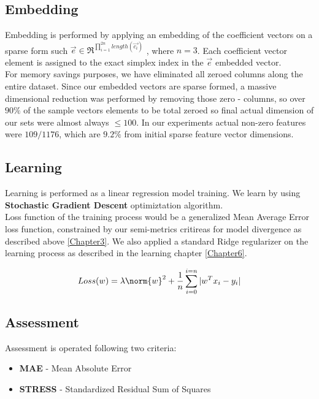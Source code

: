 \subsection{Embedding}
Embedding is performed by applying an embedding of the coefficient vectors on a sparse form such $\overrightarrow{e} \in \Re^{\prod_{i=1}^{2n}{length(\overrightarrow{c_i})}}$ , where $n = 3$.
Each coefficient vector element is assigned to the exact simplex index in the $\overrightarrow{e}$ embedded vector.
\\
For memory savings purposes, we have eliminated all zeroed columns along the entire dataset.
Since our embedded vectors are sparse formed, a massive dimensional reduction was performed by removing those zero - columns, so over $90 \% $ of the sample vectors elements to be total zeroed so final actual dimension of our sets were almost always $ \le 100$. In our experiments actual non-zero features were $109/1176$, which are $9.2 \%$ from initial sparse feature vector dimensions.

\subsection{Learning}
Learning is performed as a linear regression model training.
We learn by using \textbf{Stochastic Gradient Descent} \cite{SGD} optimiztation algorithm. \\
Loss function of the training process would be a generalized Mean Average Error \cite{MAE} loss function, constrained by our semi-metrics critireas for model divergence as described above \ref{Chapter3}.
We also applied a standard Ridge \cite{Ridge} regularizer on the learning process as described in the learning chapter \ref{Chapter6}.
\cite{retargeting} \cite{einstein}

\begin{equation}
Loss(w)=\lambda\norm{w}^2 + \frac{1}{n}\sum_{i=0}^{i=n} |w^T x_i - y_i|
\end{equation}

\subsection{Assessment}
Assessment is operated following two criteria:
\begin{itemize}
\item \textbf{MAE} - Mean Absolute Error
\item \textbf{STRESS} - Standardized Residual Sum of Squares \cite{STRESS} \\
\end{itemize}

